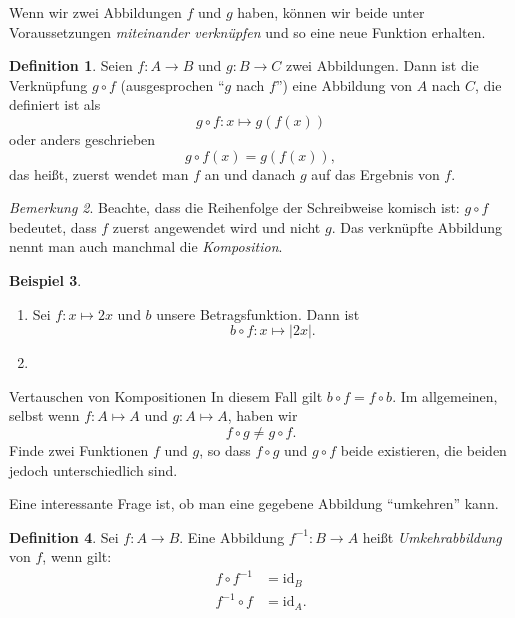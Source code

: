\documentclass[a4paper,ngerman,12pt]{zirkelblatt1415}
\theoremstyle{definition}
\newtheorem{definition}{Definition}
\newtheorem{beispiel}[definition]{Beispiel}
\theoremstyle{remark}
\newtheorem{bem}[definition]{Bemerkung}
\begin{document}
Wenn wir zwei Abbildungen $f$ und $g$ haben, können wir beide unter Voraussetzungen \emph{miteinander verknüpfen} und so eine neue Funktion erhalten.
\begin{definition}
Seien $f: A\longrightarrow B$ und $g: B\longrightarrow C$ zwei Abbildungen. Dann ist die Verknüpfung $g\circ f$ (ausgesprochen "`$g$ nach $f$"') eine Abbildung von $A$ nach $C$, die definiert ist als
\[
g\circ f: x \mapsto g\left(f(x)\right)
\]
oder anders geschrieben
\begin{equation*}
  g\circ f(x)=g(f(x)),
\end{equation*}
das heißt, zuerst wendet man $f$ an und danach $g$ auf das Ergebnis von $f$.
\end{definition}

\begin{bem}
  Beachte, dass die Reihenfolge der Schreibweise komisch ist: $g\circ f$ bedeutet, dass $f$ zuerst angewendet wird und nicht $g$. Das verknüpfte Abbildung nennt man auch manchmal die \emph{Komposition}.
\end{bem}

\begin{beispiel}
  \begin{enumerate}
    \item Sei $f:x\mapsto 2x$ und $b$ unsere Betragsfunktion. Dann ist
      \[
        b\circ f: x\mapsto |2x|.
      \]
    \item
  \end{enumerate}
\end{beispiel}

\begin{aufgabe}{Vertauschen von Kompositionen}
In diesem Fall gilt $b\circ f = f \circ b$. Im allgemeinen, selbst wenn $f:A\mapsto A$ und $g:A\mapsto A$, haben wir
\[
f\circ g \neq g \circ f.
\]
Finde zwei Funktionen $f$ und $g$, so dass $f\circ g$ und $g\circ f$ beide existieren, die beiden jedoch unterschiedlich sind. 
\end{aufgabe}

Eine interessante Frage ist, ob man eine gegebene Abbildung "`umkehren"' kann.
\begin{definition}
Sei $f:A\longrightarrow B$. Eine Abbildung $f^{-1}:B\longrightarrow A$ heißt \emph{Umkehrabbildung} von $f$, wenn gilt:
\begin{align*}
f\circ f^{-1}& = \text{id}_B\\
f^{-1}\circ f& = \text{id}_A.
\end{align*}
\end{definition}
\end{document}
